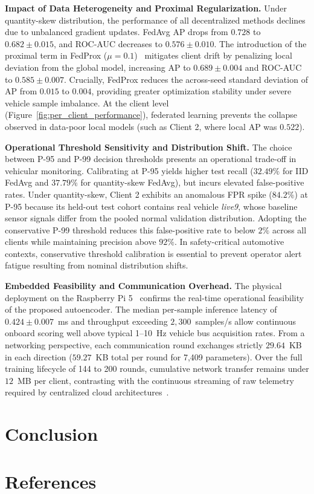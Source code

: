 \documentclass[12pt]{article}
\begin{document}
\textbf{Impact of Data Heterogeneity and Proximal Regularization.}
Under quantity-skew distribution, the performance of all decentralized methods declines due to unbalanced gradient updates. FedAvg AP drops from $0.728$ to $0.682 \pm 0.015$, and ROC-AUC decreases to $0.576 \pm 0.010$. The introduction of the proximal term in FedProx ($\mu = 0.1$)~\cite{li2020federated} mitigates client drift by penalizing local deviation from the global model, increasing AP to $0.689 \pm 0.004$ and ROC-AUC to $0.585 \pm 0.007$. Crucially, FedProx reduces the across-seed standard deviation of AP from $0.015$ to $0.004$, providing greater optimization stability under severe vehicle sample imbalance. At the client level (Figure~\ref{fig:per_client_performance}), federated learning prevents the collapse observed in data-poor local models (such as Client 2, where local AP was $0.522$).

\textbf{Operational Threshold Sensitivity and Distribution Shift.}
The choice between P-95 and P-99 decision thresholds presents an operational trade-off in vehicular monitoring. Calibrating at P-95 yields higher test recall ($32.49\%$ for IID FedAvg and $37.79\%$ for quantity-skew FedAvg), but incurs elevated false-positive rates. Under quantity-skew, Client 2 exhibits an anomalous FPR spike ($84.2\%$) at P-95 because its held-out test cohort contains real vehicle \textit{live9}, whose baseline sensor signals differ from the pooled normal validation distribution. Adopting the conservative P-99 threshold reduces this false-positive rate to below $2\%$ across all clients while maintaining precision above $92\%$. In safety-critical automotive contexts, conservative threshold calibration is essential to prevent operator alert fatigue resulting from nominal distribution shifts.

\textbf{Embedded Feasibility and Communication Overhead.}
The physical deployment on the Raspberry Pi 5~\cite{barbosa2025practical,beutel2020flower} confirms the real-time operational feasibility of the proposed autoencoder. The median per-sample inference latency of $0.424 \pm 0.007$~ms and throughput exceeding $2,300$~samples/s allow continuous onboard scoring well above typical 1--10~Hz vehicle bus acquisition rates. From a networking perspective, each communication round exchanges strictly $29.64$~KB in each direction ($59.27$~KB total per round for 7,409 parameters). Over the full training lifecycle of 144 to 200 rounds, cumulative network transfer remains under $12$~MB per client, contrasting with the continuous streaming of raw telemetry required by centralized cloud architectures~\cite{braun2025which}.

\section{Conclusion}
\label{sec:Conclusion}


\section{References}



\end{document}
